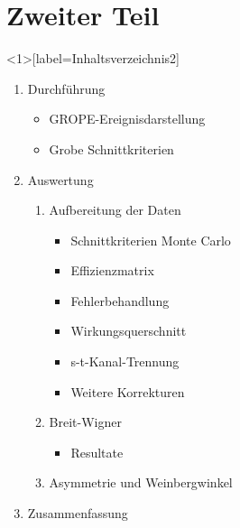 \documentclass{beamer}
\begin{document}
\section{Zweiter Teil}
\begin{frame}<1>[label=Inhaltsverzeichnis2]
	\begin{enumerate}
		\item<alert@4> Durchführung
		\begin{itemize}
			\item<alert@41> GROPE-Ereignisdarstellung
			\item<alert@41> Grobe Schnittkriterien
		\end{itemize}
		\item<alert@5> Auswertung
		\begin{enumerate}
			\item<alert@50> Aufbereitung der Daten
			\begin{itemize}
				\item<alert@51> Schnittkriterien Monte Carlo
				\item<alert@52> Effizienzmatrix
				\item<alert@53> Fehlerbehandlung
				\item<alert@54> Wirkungsquerschnitt
				\item<alert@55> s-t-Kanal-Trennung
				\item<alert@56> Weitere Korrekturen	
			\end{itemize}
			\item<alert@57> Breit-Wigner
			\begin{itemize}
				\item Resultate
			\end{itemize}
			\item<alert@58> Asymmetrie und Weinbergwinkel
		\end{enumerate}
		\item<alert@6> Zusammenfassung
	\end{enumerate}
\end{frame}
\end{document}
